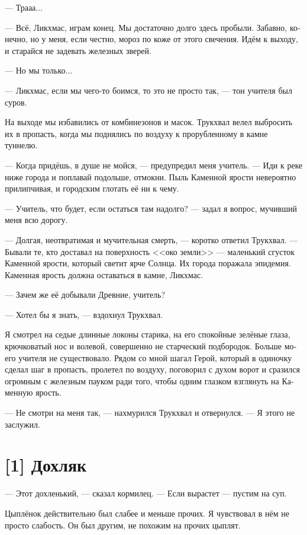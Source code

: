 \documentclass[a4paper,12pt,fleqn]{book}\usepackage{polyglossia}\setdefaultlanguage[babelshorthands=true]{russian}\setotherlanguage{english}\defaultfontfeatures{Ligatures=TeX,Mapping=tex-text}\usepackage{xcolor}\newcommand{\ml}[3]{#2}
\newcommand{\asterism}{\vspace{1em}{\centering\Large\bfseries$\ast~\ast~\ast$\par}\vspace{1em}}
\begin{document}
{--- Трааа...

--- Всё, Ликхмас, играм конец.
Мы достаточно долго здесь пробыли.
Забавно, конечно, но у меня, если честно, мороз по коже от этого свечения.
Идём к выходу, и старайся не задевать железных зверей.

--- Но мы только...

--- Ликхмас, если мы чего-то боимся, то это не просто так, --- тон учителя был суров.

\asterism

На выходе мы избавились от комбинезонов и масок.
Трукхвал велел выбросить их в пропасть, когда мы поднялись по воздуху к прорубленному в камне туннелю.

--- Когда придёшь, в душе не мойся, --- предупредил меня учитель.
--- Иди к реке ниже города и поплавай подольше, отмокни.
Пыль Каменной ярости невероятно прилипчивая, и городским глотать её ни к чему.

--- Учитель, что будет, если остаться там надолго? --- задал я вопрос, мучивший меня всю дорогу.

--- Долгая, неотвратимая и мучительная смерть, --- коротко ответил Трукхвал.
--- Бывали те, кто доставал на поверхность <<око земли>> --- маленький сгусток Каменной ярости, который светит ярче Солнца.
Их города поражала эпидемия.
Каменная ярость должна оставаться в камне, Ликхмас.

--- Зачем же её добывали Древние, учитель?

--- Хотел бы я знать, --- вздохнул Трукхвал.

Я смотрел на седые длинные локоны старика, на его спокойные зелёные глаза, крючковатый нос и волевой, совершенно не старческий подбородок.
Больше моего учителя не существовало.
Рядом со мной шагал Герой, который в одиночку сделал шаг в пропасть, пролетел по воздуху, поговорил с духом ворот и сразился огромным с железным пауком ради того, чтобы одним глазком взглянуть на Каменную ярость.

--- Не смотри на меня так, --- нахмурился Трукхвал и отвернулся.
--- Я этого не заслужил.

\section{[1] Дохляк}

--- Этот дохленький, --- сказал кормилец.
--- Если вырастет --- пустим на суп.

Цыплёнок действительно был слабее и меньше прочих.
Я чувствовал в нём не просто слабость.
Он был другим, не похожим на прочих цыплят.

}
\end{document}
